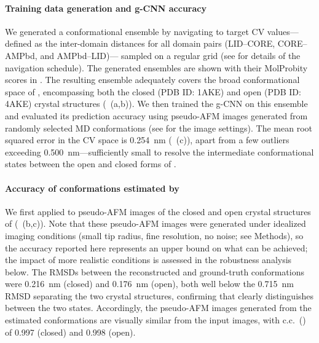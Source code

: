\paragraph{Training data generation and g-CNN accuracy}
We generated a conformational ensemble by navigating \AFiii to target CV values---defined as the inter-domain distances for all domain pairs (LID--CORE, CORE--AMPbd, and AMPbd--LID)---
sampled on a regular grid (see  for details of the navigation schedule).
The generated ensembles are shown with their MolProbity scores in .
The resulting ensemble adequately covers the broad conformational space of \AK, encompassing both the closed (PDB ID: 1AKE) and open (PDB ID: 4AKE) crystal structures (~(a,b)).
We then trained the g-CNN on this ensemble and evaluated its prediction accuracy using pseudo-AFM images generated from randomly selected MD conformations (see  for the image settings).
The mean root squared error in the CV space is 0.254~nm (~(c)), apart from a few outliers exceeding 0.500~nm---sufficiently small to resolve the intermediate conformational states between the open and closed forms of \AK.

\paragraph{Accuracy of conformations estimated by \Model}
We first applied \Model to pseudo-AFM images of the closed and open crystal structures of \AK (~(b,c)).
Note that these pseudo-AFM images were generated under idealized imaging conditions (small tip radius, fine resolution, no noise; see Methods), so the accuracy reported here represents an upper bound on what can be achieved; the impact of more realistic conditions is assessed in the robustness analysis below.
The RMSDs between the reconstructed and ground-truth conformations were 0.216~nm (closed) and 0.176~nm (open), both well below the 0.715~nm RMSD separating the two crystal structures, confirming that \Model clearly distinguishes between the two states.
Accordingly, the pseudo-AFM images generated from the estimated conformations are visually similar from the input images, with c.c.\ () of 0.997 (closed) and 0.998 (open).

